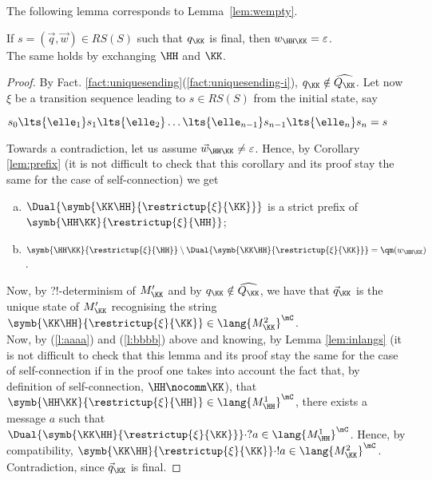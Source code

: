 The following lemma corresponds to Lemma~\ref{lem:wempty}.
 
 
  \begin{lemma}
\label{lem:wemptyself}
If $s= (\vec{q},\vec{w}) \in RS(S)$
such that ${q}_\KK$ is final, then ${w}_{\HH\KK} = \varepsilon$.\\
The same holds by exchanging $\HH$ and $\KK$.
\end{lemma}

\begin{proof}
By Fact. \ref{fact:uniquesending}(\ref{fact:uniquesending-i}), 
$q_\KK\notin \widehat{Q_\KK}$.
Let now $\xi$ be a transition sequence leading to $s\in RS(S)$ from the initial state, say\\
\centerline{
$s_0\lts{\elle_1}s_1\lts{\elle_2} \ldots \lts{\elle_{n-1}}s_{n-1}\lts{\elle_n}s_n=s$
}
Towards a contradiction, let us assume $\vec{w}_{\HH\KK}\neq \varepsilon$.
Hence, by Corollary \ref{lem:prefix} (it is not difficult to check that this corollary and its proof stay the same for the case of self-connection) we get
\begin{enumerate}[a)]
\item 
\label{l:aaaa}
$\Dual{\symb{\KK\HH}{\restrictup{\xi}{\KK}}}$
 is a strict prefix of
$\symb{\HH\KK}{\restrictup{\xi}{\HH}}$;
\item
\label{l:bbbb}
$\symb{\HH\KK}{\restrictup{\xi}{\HH}}\setminus \Dual{\symb{\KK\HH}{\restrictup{\xi}{\KK}}} = \qm({{w}_{\HH\KK}})$.
\end{enumerate}
Now, by ?!-determinism of 
$M'_\KK$ and by 
$q_\KK\notin \widehat{Q_\KK}$, we have that $\vec{q}_\KK$ is the unique state of $M'_\KK$ recognising the string 
$\symb{\KK\HH}{\restrictup{\xi}{\KK}}\in \lang{M^2_\KK}^\mC$.\\
Now, by (\ref{l:aaaa}) and (\ref{l:bbbb}) above and knowing, by Lemma \ref{lem:inlangs}
(it is not difficult to check that this lemma and its proof stay the same for the case of self-connection if in the proof one takes into account the fact that, by definition of self-connection, $\HH\nocomm\KK$), that $\symb{\HH\KK}{\restrictup{\xi}{\HH}}\in\lang{M^1_\HH}^\mC $, 
there exists a message $a$ such that
$\Dual{\symb{\KK\HH}{\restrictup{\xi}{\KK}}}\cdot ?a \in \lang{M^1_\HH}^\mC$.
Hence, by compatibility, $\symb{\KK\HH}{\restrictup{\xi}{\KK}}\cdot !a \in \lang{M^2_\KK}^\mC$.
Contradiction, since $\vec{q}_\KK$ is final.
\end{proof}

